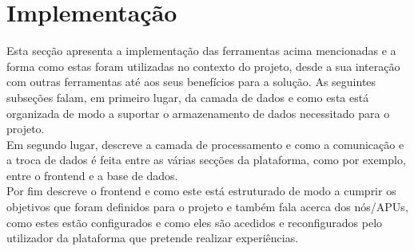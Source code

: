 \chapter{Implementação}
\label{chp:implement}
Esta secção apresenta a implementação das ferramentas acima mencionadas e a forma como estas foram utilizadas no contexto do projeto, desde a sua interação com outras ferramentas até aos seus benefícios para a solução. As seguintes subseções falam, em primeiro lugar, da camada de dados e como esta está organizada de modo a suportar o armazenamento de dados necessitado para o projeto.\newline\\
Em segundo lugar, descreve a camada de processamento e como a comunicação e a troca de dados é feita entre as várias secções da plataforma, como por exemplo, entre o frontend e a base de dados.\newline\\
Por fim descreve o frontend e como este está estruturado de modo a cumprir os objetivos que foram definidos para o projeto e também fala acerca dos nós/APUs, como estes estão configurados e como eles são acedidos e reconfigurados pelo utilizador da plataforma que pretende realizar experiências.

